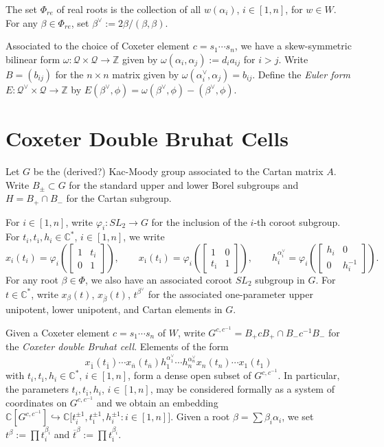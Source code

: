 \documentclass{amsart}
\numberwithin{theorem}{section}
\newcommand{\cQ}{\mathcal{Q}}
\newcommand{\CC}{\mathbb{C}}
\newcommand{\ZZ}{\mathbb{Z}}
\newcommand{\ol}[1]{{\overline{#1}}}
\newcommand{\into}{\hookrightarrow}
\newcommand{\oi}{{\overline{\imath}}}
\newcommand{\ot}{{\overline{t}}}
\begin{document}
    The set $\Phi_{re}$ of real roots is the collection of all $w(\alpha_i)$, $i\in[1,n]$, for $w\in W$.
    For any $\beta\in\Phi_{re}$, set $\beta^\vee:=2\beta/(\beta,\beta)$.

    Associated to the choice of Coxeter element $c=s_1\cdots s_n$, we have a skew-symmetric bilinear form $\omega:\cQ\times\cQ\to\ZZ$ given by $\omega(\alpha_i,\alpha_j):=d_ia_{ij}$ for $i>j$.
    Write $B=(b_{ij})$ for the $n\times n$ matrix given by $\omega(\alpha_i^\vee,\alpha_j)=b_{ij}$.
    Define the \emph{Euler form} $E:\cQ^\vee\times\cQ\to\ZZ$ by $E(\beta^\vee,\phi)=\omega(\beta^\vee,\phi)-(\beta^\vee,\phi)$.


  \section{Coxeter Double Bruhat Cells}
    Let $G$ be the (derived?) Kac-Moody group associated to the Cartan matrix $A$.
    Write $B_\pm\subset G$ for the standard upper and lower Borel subgroups and $H=B_+\cap B_-$ for the Cartan subgroup.

    For $i\in[1,n]$, write $\varphi_i:SL_2\to G$ for the inclusion of the $i$-th coroot subgroup.
    For $t_i,t_\oi,h_i\in\CC^*$, $i\in[1,n]$, we write
    \[x_i(t_i)=\varphi_i\left(\left[\begin{array}{cc} 1 & t_i\\ 0 & 1\end{array}\right]\right),\qquad x_\oi(t_\oi)=\varphi_i\left(\left[\begin{array}{cc} 1 & 0\\ t_\oi & 1\end{array}\right]\right), \qquad h_i^{\alpha_i^\vee}=\varphi_i\left(\left[\begin{array}{cc} h_i & 0\\ 0 & h_i^{-1}\end{array}\right]\right).\]
    For any root $\beta\in\Phi$, we also have an associated coroot $SL_2$ subgroup in $G$.
    For $t\in\CC^*$, write $x_\beta(t)$, $x_{\ol{\beta}}(t)$, $t^{\beta^\vee}$ for the associated one-parameter upper unipotent, lower unipotent, and Cartan elements in $G$.

    Given a Coxeter element $c=s_1\cdots s_n$ of $W$, write $G^{c,c^{-1}}=B_+ c B_+\cap B_- c^{-1} B_-$ for the \emph{Coxeter double Bruhat cell}.
    Elements of the form 
    \begin{equation}
      \label{eq:generic element}
      x_{\ol{1}}(t_{\ol{1}})\cdots x_{\ol{n}}(t_{\ol{n}}) h_1^{\alpha_1^\vee}\cdots h_n^{\alpha_n^\vee} x_n(t_n)\cdots x_1(t_1)
    \end{equation}
    with $t_i,t_\oi,h_i\in\CC^*$, $i\in[1,n]$, form a dense open subset of $G^{c,c^{-1}}$.
    In particular, the parameters $t_i,t_\oi,h_i$, $i\in[1,n]$, may be considered formally as a system of coordinates on $G^{c,c^{-1}}$ and we obtain an embedding $\CC[G^{c,c^{-1}}]\into\CC\big[t_i^{\pm1},t_\oi^{\pm1},h_i^{\pm1}:i\in[1,n]\big]$.
    Given a root $\beta=\sum\beta_i\alpha_i$, we set $t^\beta:=\prod t_i^{\beta_i}$ and $\ot^\beta:=\prod t_\oi^{\beta_i}$.
    
\end{document}
